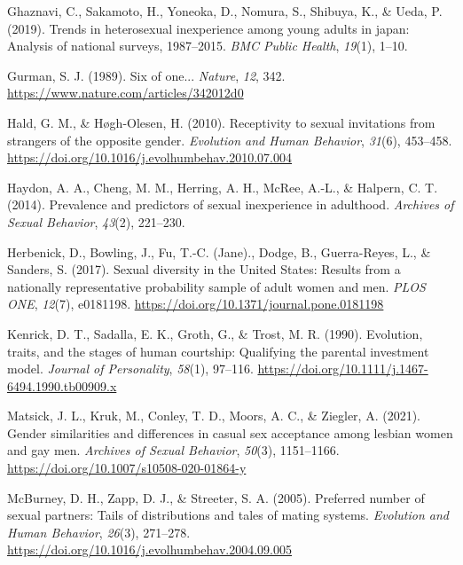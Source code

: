 \documentclass[
  12pt,
]{article}
\newlength{\cslhangindent}
\newlength{\cslentryspacingunit} %
\newenvironment{CSLReferences}[2] %
 {%
  \setlength{\parindent}{0pt}
  \ifodd #1
  \let\oldpar\par
  \def\par{\hangindent=\cslhangindent\oldpar}
  \fi
  \setlength{\parskip}{#2\cslentryspacingunit}
 }%
 {}
\begin{document}
\begin{CSLReferences}{1}{0}
\leavevmode{}%
Ghaznavi, C., Sakamoto, H., Yoneoka, D., Nomura, S., Shibuya, K., \&
Ueda, P. (2019). Trends in heterosexual inexperience among young adults
in japan: Analysis of national surveys, 1987--2015. \emph{BMC Public
Health}, \emph{19}(1), 1--10.

\leavevmode{}%
Gurman, S. J. (1989). Six of one... \emph{Nature}, \emph{12}, 342.
\url{https://www.nature.com/articles/342012d0}

\leavevmode{}%
Hald, G. M., \& Høgh-Olesen, H. (2010). Receptivity to sexual
invitations from strangers of the opposite gender. \emph{Evolution and
Human Behavior}, \emph{31}(6), 453--458.
\url{https://doi.org/10.1016/j.evolhumbehav.2010.07.004}

\leavevmode{}%
Haydon, A. A., Cheng, M. M., Herring, A. H., McRee, A.-L., \& Halpern,
C. T. (2014). Prevalence and predictors of sexual inexperience in
adulthood. \emph{Archives of Sexual Behavior}, \emph{43}(2), 221--230.

\leavevmode{}%
Herbenick, D., Bowling, J., Fu, T.-C. (Jane)., Dodge, B., Guerra-Reyes,
L., \& Sanders, S. (2017). Sexual diversity in the {United States}:
Results from a nationally representative probability sample of adult
women and men. \emph{{PLOS} {ONE}}, \emph{12}(7), e0181198.
\url{https://doi.org/10.1371/journal.pone.0181198}

\leavevmode{}%
Kenrick, D. T., Sadalla, E. K., Groth, G., \& Trost, M. R. (1990).
Evolution, traits, and the stages of human courtship: Qualifying the
parental investment model. \emph{Journal of Personality}, \emph{58}(1),
97--116. \url{https://doi.org/10.1111/j.1467-6494.1990.tb00909.x}

\leavevmode{}%
Matsick, J. L., Kruk, M., Conley, T. D., Moors, A. C., \& Ziegler, A.
(2021). Gender similarities and differences in casual sex acceptance
among lesbian women and gay men. \emph{Archives of Sexual Behavior},
\emph{50}(3), 1151--1166.
\url{https://doi.org/10.1007/s10508-020-01864-y}

\leavevmode{}%
McBurney, D. H., Zapp, D. J., \& Streeter, S. A. (2005). Preferred
number of sexual partners: Tails of distributions and tales of mating
systems. \emph{Evolution and Human Behavior}, \emph{26}(3), 271--278.
\url{https://doi.org/10.1016/j.evolhumbehav.2004.09.005}


\end{CSLReferences}
\end{document}
